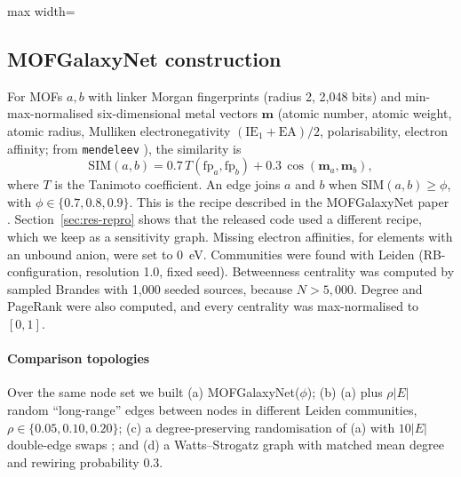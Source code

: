 \begin{table}[t]
\centering
\caption{QMOF filtering (Phase 2).}
\label{tab:filters}
\small
\begin{adjustbox}{max width=\textwidth}\end{adjustbox}
\end{table}

\subsection{MOFGalaxyNet construction}
\label{sec:graph}
For MOFs $a,b$ with linker Morgan fingerprints \citep{rogers2010ecfp} (radius 2, 2{,}048 bits) and min-max-normalised six-dimensional metal vectors $\mathbf{m}$ (atomic number, atomic weight, atomic radius, Mulliken electronegativity $(\mathrm{IE}_1+\mathrm{EA})/2$, polarisability, electron affinity; from \texttt{mendeleev} \citep{mendeleev}), the similarity is
\begin{equation}
\mathrm{SIM}(a,b) = 0.7\,T(\mathrm{fp}_a,\mathrm{fp}_b) + 0.3\,\cos(\mathbf{m}_a,\mathbf{m}_b),
\label{eq:sim}
\end{equation}
where $T$ is the Tanimoto coefficient. An edge joins $a$ and $b$ when $\mathrm{SIM}(a,b)\geq\phi$, with $\phi\in\{0.7,0.8,0.9\}$. This is the recipe described in the MOFGalaxyNet paper \citep{jalali2023mofgalaxynet}. Section~\ref{sec:res-repro} shows that the released code used a different recipe, which we keep as a sensitivity graph. Missing electron affinities, for elements with an unbound anion, were set to 0~eV. Communities were found with Leiden \citep{traag2019leiden} (RB-configuration, resolution 1.0, fixed seed). Betweenness centrality was computed by sampled Brandes \citep{brandes2001faster} with 1{,}000 seeded sources, because $N>5{,}000$. Degree and PageRank were also computed, and every centrality was max-normalised to $[0,1]$.

\paragraph{Comparison topologies}
Over the same node set we built (a) MOFGalaxyNet($\phi$); (b) (a) plus $\rho|E|$ random ``long-range'' edges between nodes in different Leiden communities, $\rho\in\{0.05,0.10,0.20\}$; (c) a degree-preserving randomisation of (a) with $10|E|$ double-edge swaps \citep{maslov2002specificity}; and (d) a Watts--Strogatz graph \citep{watts1998small} with matched mean degree and rewiring probability 0.3.

